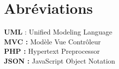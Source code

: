 \chapter{Abréviations}

\textbf{UML }: Unified Modeling Language\\
\textbf{MVC :} Modèle Vue Contrôleur\\
\textbf{PHP :} Hypertext Preprocessor\\
\textbf{JSON :} JavaScript Object Notation\\
